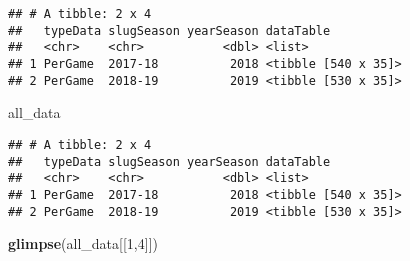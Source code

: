 \documentclass[]{article}
\newenvironment{Shaded}{\begin{snugshade}}{\end{snugshade}}
\newcommand{\KeywordTok}[1]{\textcolor[rgb]{0.13,0.29,0.53}{\textbf{#1}}}
\newcommand{\DataTypeTok}[1]{\textcolor[rgb]{0.13,0.29,0.53}{#1}}
\newcommand{\DecValTok}[1]{\textcolor[rgb]{0.00,0.00,0.81}{#1}}
\newcommand{\StringTok}[1]{\textcolor[rgb]{0.31,0.60,0.02}{#1}}
\newcommand{\OperatorTok}[1]{\textcolor[rgb]{0.81,0.36,0.00}{\textbf{#1}}}
\newcommand{\NormalTok}[1]{#1}
\begin{document}
\begin{Shaded}
\end{Shaded}

\begin{verbatim}
## # A tibble: 2 x 4
##   typeData slugSeason yearSeason dataTable          
##   <chr>    <chr>           <dbl> <list>             
## 1 PerGame  2017-18          2018 <tibble [540 x 35]>
## 2 PerGame  2018-19          2019 <tibble [530 x 35]>
\end{verbatim}

\begin{Shaded}
\begin{Highlighting}[]
\NormalTok{all_data}
\end{Highlighting}
\end{Shaded}

\begin{verbatim}
## # A tibble: 2 x 4
##   typeData slugSeason yearSeason dataTable          
##   <chr>    <chr>           <dbl> <list>             
## 1 PerGame  2017-18          2018 <tibble [540 x 35]>
## 2 PerGame  2018-19          2019 <tibble [530 x 35]>
\end{verbatim}

\begin{Shaded}
\begin{Highlighting}[]
\KeywordTok{glimpse}\NormalTok{(all_data[[}\DecValTok{1}\NormalTok{,}\DecValTok{4}\NormalTok{]])}
\end{Highlighting}
\end{Shaded}
\end{document}
